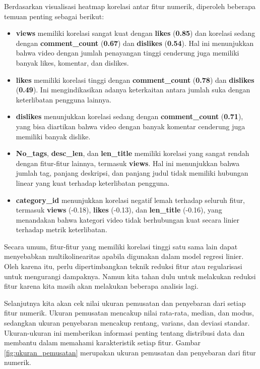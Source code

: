 Berdasarkan visualisasi heatmap korelasi antar fitur numerik, diperoleh beberapa temuan penting sebagai berikut:

\begin{itemize}
    \item \textbf{views} memiliki korelasi sangat kuat dengan \textbf{likes} (\textbf{0.85}) dan korelasi sedang dengan \textbf{comment\_count} (\textbf{0.67}) dan \textbf{dislikes} (\textbf{0.54}). Hal ini menunjukkan bahwa video dengan jumlah penayangan tinggi cenderung juga memiliki banyak likes, komentar, dan dislikes.
    
    \item \textbf{likes} memiliki korelasi tinggi dengan \textbf{comment\_count} (\textbf{0.78}) dan \textbf{dislikes} (\textbf{0.49}). Ini mengindikasikan adanya keterkaitan antara jumlah suka dengan keterlibatan pengguna lainnya.
    
    \item \textbf{dislikes} menunjukkan korelasi sedang dengan \textbf{comment\_count} (\textbf{0.71}), yang bisa diartikan bahwa video dengan banyak komentar cenderung juga memiliki banyak dislike.
    
    \item \textbf{No\_tags}, \textbf{desc\_len}, dan \textbf{len\_title} memiliki korelasi yang sangat rendah dengan fitur-fitur lainnya, termasuk \textbf{views}. Hal ini menunjukkan bahwa jumlah tag, panjang deskripsi, dan panjang judul tidak memiliki hubungan linear yang kuat terhadap keterlibatan pengguna.
    
    \item \textbf{category\_id} menunjukkan korelasi negatif lemah terhadap seluruh fitur, termasuk \textbf{views} (-0.18), \textbf{likes} (-0.13), dan \textbf{len\_title} (-0.16), yang menandakan bahwa kategori video tidak berhubungan kuat secara linier terhadap metrik keterlibatan.
\end{itemize}

Secara umum, fitur-fitur yang memiliki korelasi tinggi satu sama lain dapat menyebabkan multikolinearitas apabila digunakan dalam model regresi linier. Oleh karena itu, perlu dipertimbangkan teknik reduksi fitur atau regularisasi untuk mengurangi dampaknya. Namun kita tahan dulu untuk melakukan reduksi fitur karena kita masih akan melakukan beberapa analisis lagi.

Selanjutnya kita akan cek nilai ukuran pemusatan dan penyebaran dari setiap fitur numerik. Ukuran pemusatan mencakup nilai rata-rata, median, dan modus, sedangkan ukuran penyebaran mencakup rentang, varians, dan deviasi standar. Ukuran-ukuran ini memberikan informasi penting tentang distribusi data dan membantu dalam memahami karakteristik setiap fitur. Gambar \ref{fig:ukuran_pemusatan} merupakan ukuran pemusatan dan penyebaran dari fitur numerik.

